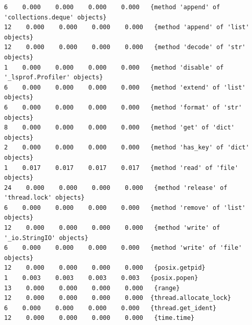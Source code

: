 \documentclass[10pt,twocolumn,letterpaper]{article}
\begin{document}
\begin{appendices}
\begin{verbatim}
6    0.000    0.000    0.000    0.000   {method 'append' of 'collections.deque' objects}
12    0.000    0.000    0.000    0.000   {method 'append' of 'list' objects}
12    0.000    0.000    0.000    0.000   {method 'decode' of 'str' objects}
1    0.000    0.000    0.000    0.000   {method 'disable' of '_lsprof.Profiler' objects}
6    0.000    0.000    0.000    0.000   {method 'extend' of 'list' objects}
6    0.000    0.000    0.000    0.000   {method 'format' of 'str' objects}
8    0.000    0.000    0.000    0.000   {method 'get' of 'dict' objects}
2    0.000    0.000    0.000    0.000   {method 'has_key' of 'dict' objects}
1    0.017    0.017    0.017    0.017   {method 'read' of 'file' objects}
24    0.000    0.000    0.000    0.000   {method 'release' of 'thread.lock' objects}
6    0.000    0.000    0.000    0.000   {method 'remove' of 'list' objects}
12    0.000    0.000    0.000    0.000   {method 'write' of '_io.StringIO' objects}
6    0.000    0.000    0.000    0.000   {method 'write' of 'file' objects}
12    0.000    0.000    0.000    0.000   {posix.getpid}
1    0.003    0.003    0.003    0.003   {posix.popen}
13    0.000    0.000    0.000    0.000   {range}
12    0.000    0.000    0.000    0.000  {thread.allocate_lock}
6    0.000    0.000    0.000    0.000   {thread.get_ident}
12    0.000    0.000    0.000    0.000   {time.time}
\end{verbatim}



\end{appendices}
\end{document}
